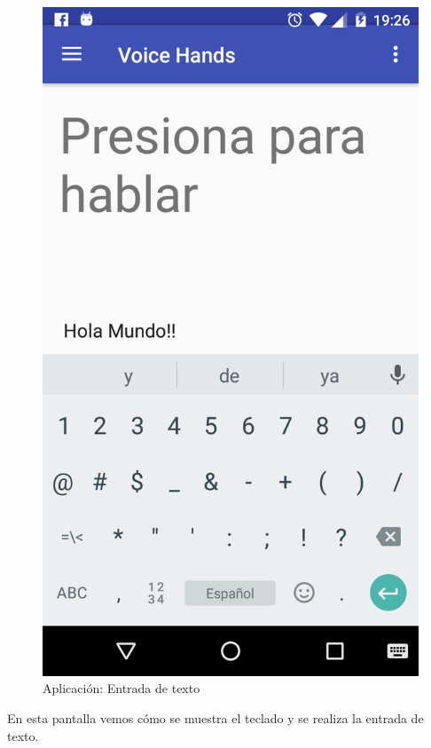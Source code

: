 \begin{figure}[H]
	\centering
	\includegraphics[scale = 0.2]{figures/app07}
	\caption{Aplicación: Entrada de texto}
	\label{fig:app07}
\end{figure}

En esta pantalla vemos cómo se muestra el teclado y se realiza la entrada de texto.

